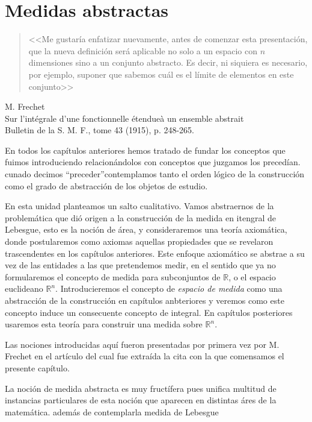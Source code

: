 \chapter{Medidas abstractas}

\begin{quote}
 <<Me gustaría enfatizar nuevamente, antes de comenzar esta presentación, que la nueva definición será aplicable no solo a un espacio con $n$ dimensiones sino a un conjunto abstracto. Es decir, ni siquiera es necesario, por ejemplo, suponer que sabemos cuál es el límite de elementos en este conjunto>> 
\end{quote}
\begin{flushright}
 M. Frechet \\
Sur l’intégrale d’une fonctionnelle étendueà un ensemble abstrait\\
Bulletin de la S. M. F., tome  43 (1915), p. 248-265.
\end{flushright}

En todos los capítulos anteriores hemos tratado de fundar los conceptos que fuimos introduciendo relacionándolos con  conceptos que juzgamos los precedían. cunado decimos  ``preceder''contemplamos tanto el orden lógico de la construcción  como  el grado de abstracción de los objetos de estudio.

En esta unidad planteamos un salto cualitativo. Vamos abstraernos de la problemática que dió origen a la construcción de la medida en itengral de Lebesgue, esto es la noción de área, y consideraremos una teoría axiomática, donde postularemos como axiomas aquellas propiedades que se revelaron trascendentes en los capítulos anteriores. Este enfoque axiomático se abstrae a su vez de las entidades a las que pretendemos medir, en el sentido que ya no formularemos el concepto de medida para subconjuntos de $\mathbb{R}$, o el espacio euclideano $\mathbb{R}^n$. Introducieremos el concepto de \emph{espacio de medida}  como una abstracción de la construcción en capítulos anbteriores y veremos como este concepto induce un consecuente concepto de integral. En capítulos posteriores usaremos esta teoría para construir una medida sobre $\mathbb{R}^n$.


Las nociones introducidas aquí fueron presentadas por primera vez por M. Frechet en el artículo del cual fue extraída la cita con la que comensamos el presente capítulo. 

La noción de medida abstracta es muy fructífera pues unifica multitud de instancias particulares de esta noción que aparecen en distintas áres de la matemática.  además de contemplarla medida de Lebesgue 

